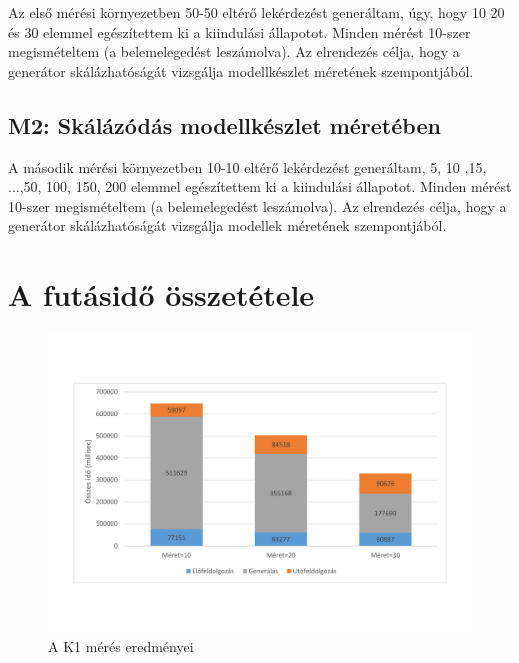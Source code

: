 Az első mérési környezetben 50-50 eltérő lekérdezést generáltam, úgy, hogy 10 20 és 30 elemmel egészítettem ki a kiindulási állapotot. Minden mérést 10-szer megismételtem (a belemelegedést leszámolva). Az elrendezés célja, hogy a generátor skálázhatóságát vizsgálja modellkészlet méretének szempontjából.

\subsection{M2: Skálázódás modellkészlet méretében} 
A második  mérési környezetben 10-10 eltérő lekérdezést generáltam, 5, 10 ,15, ...,50, 100, 150, 200 elemmel egészítettem ki a kiindulási állapotot. Minden mérést 10-szer megismételtem (a belemelegedést leszámolva). Az elrendezés célja, hogy a generátor skálázhatóságát vizsgálja modellek méretének szempontjából.


\section{A futásidő összetétele}

\begin{figure}[htp]
	\centering
	\includegraphics[width=1\textwidth]{figures/aránygrafikontáblázathelyett}
	\caption{A K1 mérés eredményei}
	\label{fig:grafikon}
\end{figure}

